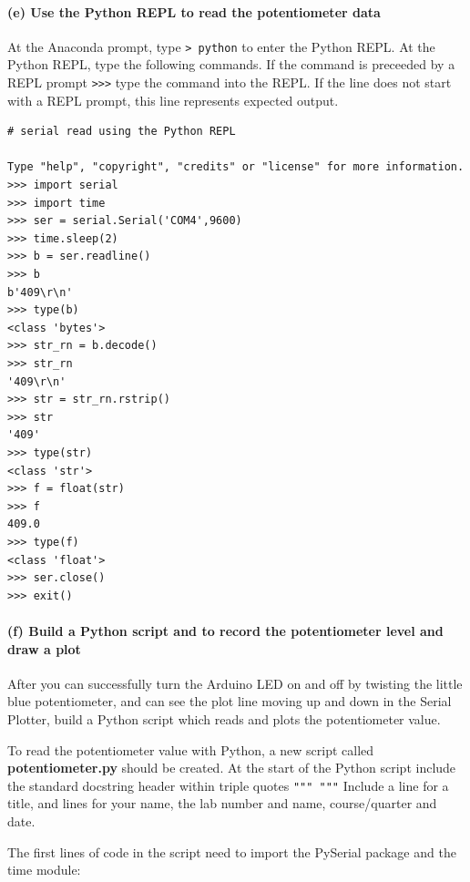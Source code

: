 \documentclass[11pt]{article}
\begin{document}
    \hypertarget{e-use-the-python-repl-to-read-the-potentiometer-data}{%
\paragraph{(e) Use the Python REPL to read the potentiometer
data}\label{e-use-the-python-repl-to-read-the-potentiometer-data}}

At the Anaconda prompt, type \texttt{\textgreater{}\ python} to enter
the Python REPL. At the Python REPL, type the following commands. If the
command is preceeded by a REPL prompt
\texttt{\textgreater{}\textgreater{}\textgreater{}} type the command
into the REPL. If the line does not start with a REPL prompt, this line
represents expected output.

\begin{verbatim}
# serial read using the Python REPL

Type "help", "copyright", "credits" or "license" for more information.
>>> import serial
>>> import time
>>> ser = serial.Serial('COM4',9600)
>>> time.sleep(2)
>>> b = ser.readline()
>>> b
b'409\r\n'
>>> type(b)
<class 'bytes'>
>>> str_rn = b.decode()
>>> str_rn
'409\r\n'
>>> str = str_rn.rstrip()
>>> str
'409'
>>> type(str)
<class 'str'>
>>> f = float(str)
>>> f
409.0
>>> type(f)
<class 'float'>
>>> ser.close()
>>> exit()
\end{verbatim}

    \hypertarget{f-build-a-python-script-and-to-record-the-potentiometer-level-and-draw-a-plot}{%
\paragraph{(f) Build a Python script and to record the potentiometer
level and draw a
plot}\label{f-build-a-python-script-and-to-record-the-potentiometer-level-and-draw-a-plot}}

After you can successfully turn the Arduino LED on and off by twisting
the little blue potentiometer, and can see the plot line moving up and
down in the Serial Plotter, build a Python script which reads and plots
the potentiometer value.

To read the potentiometer value with Python, a new script called
\textbf{potentiometer.py} should be created. At the start of the Python
script include the standard docstring header within triple quotes
\texttt{"""\ """} Include a line for a title, and lines for your name,
the lab number and name, course/quarter and date.

The first lines of code in the script need to import the PySerial
package and the time module:
\end{document}
